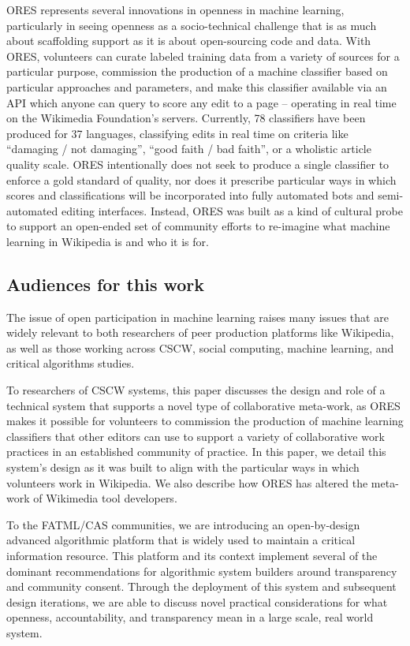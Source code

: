 ORES represents several innovations in openness in machine learning, particularly in seeing openness as a socio-technical challenge that is as much about scaffolding support as it is about open-sourcing code and data. With ORES, volunteers can curate labeled training data from a variety of sources for a particular purpose, commission the production of a machine classifier based on particular approaches and parameters, and make this classifier available via an API which anyone can query to score any edit to a page -- operating in real time on the Wikimedia Foundation's servers. Currently, 78 classifiers have been produced for 37 languages, classifying edits in real time on criteria like ``damaging / not damaging'', ``good faith / bad faith'', or a wholistic article quality scale. ORES intentionally does not seek to produce a single classifier to enforce a gold standard of quality, nor does it prescribe particular ways in which scores and classifications will be incorporated into fully automated bots and semi-automated editing interfaces. Instead, ORES was built as a kind of cultural probe to support an open-ended set of community efforts to re-imagine what machine learning in Wikipedia is and who it is for.

\subsection{Audiences for this work}
The issue of open participation in machine learning raises many issues that are widely relevant to both researchers of peer production platforms like Wikipedia, as well as those working across CSCW, social computing, machine learning, and critical algorithms studies.

To researchers of CSCW systems, this paper discusses the design and role of a technical system that supports a novel type of collaborative meta-work, as ORES makes it possible for volunteers to commission the production of machine learning classifiers that other editors can use to support a variety of collaborative work practices in an established community of practice. In this paper, we detail this system's design as it was built to align with the particular ways in which volunteers work in Wikipedia. We also describe how ORES has altered the meta-work of Wikimedia tool developers.

To the FATML/CAS communities, we are introducing an open-by-design advanced algorithmic platform that is widely used to maintain a critical information resource.  This platform and its context implement several of the dominant recommendations for algorithmic system builders around transparency and community consent\cite{crawford2016algorithm,diakopoulos2015algorithmic,gillespie2014relevance,tufekci2015algorithms,sandvig2014auditing}.  Through the deployment of this system and subsequent design iterations, we are able to discuss novel practical considerations for what openness, accountability, and transparency mean in a large scale, real world system.

